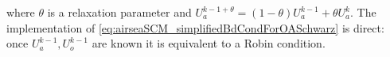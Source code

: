 where $\theta$ is a relaxation parameter and
$U_a^{k-1+\theta} = (1-\theta) U_a^{k-1} + \theta U_a^{k}$.
The implementation of
\eqref{eq:airseaSCM_simplifiedBdCondForOASchwarz} is direct:
once $U_a^{k-1}, U_o^{k-1}$ are known it is equivalent to a Robin
condition.
